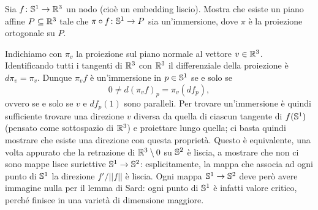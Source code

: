 \documentclass[a4paper]{article}
\begin{document}
\begin{ex}[5.5]{Sia $ f \colon \S^1 \to \R^3 $ un nodo (cioè un embedding liscio). Mostra che esiste un piano affine $ P \subseteq \R^3 $ tale che $ \pi \circ f \colon \S^1 \to P $ sia un’immersione, dove $ \pi $ è la proiezione ortogonale su $ P $.}
	
	Indichiamo con $ \pi_v $ la proiezione sul piano normale al vettore $ v \in \R^3 $. Identificando tutti i tangenti di $ \R^3 $ con $ \R^3 $ il differenziale della proiezione è $ d\pi_v = \pi_v $. Dunque $ \pi_v f $ è un'immersione in $ p \in \S^1 $ se e solo se $$ 0 \neq d(\pi_v f)_p = \pi_v (df_p), $$
	ovvero se e solo se $ v $ e $ df_p(1) $ sono paralleli. Per trovare un'immersione è quindi sufficiente trovare una direzione $ v $ diversa da quella di ciascun tangente di $ f(\S^1) $ (pensato come sottospazio di $ \R^3 $) e proiettare lungo quella; ci basta quindi mostrare che esiste una direzione con questa proprietà. Questo è equivalente, una volta appurato che la retrazione di $ \R^3\setminus{0} $ su $ \S^2 $ è liscia, a mostrare che non ci sono mappe lisce suriettive $ \S^1 \to \S^2 $: esplicitamente, la mappa che associa ad ogni punto di $ \S^1 $ la direzione $ f'/ ||f|| $ è liscia. Ogni mappa $ \S^1 \to \S^2 $ deve però avere immagine nulla per il lemma di Sard: ogni punto di $ \S^1 $ è infatti valore critico, perché finisce in una varietà di dimensione maggiore.
	
\end{ex}
\end{document}
